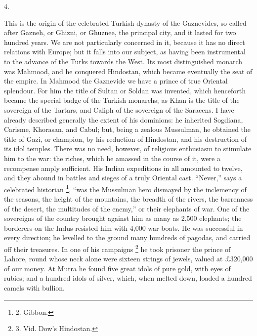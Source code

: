 4.

This is the origin of the
celebrated Turkish dynasty of the Gaznevides, so called after Gazneh,
or Ghizni, or Ghuznee, the principal city, and it lasted for two
hundred years. We are not particularly concerned in it, because it has
no direct relations with Europe; but it falls into our subject, as
having been instrumental to the advance of the Turks towards the West.
Its most distinguished monarch was Mahmood, and he conquered Hindostan,
which became eventually the seat of the empire. In Mahmood the
Gaznevide we have a prince of true Oriental splendour. For him the
title of Sultan or Soldan was invented, which henceforth became the
special badge of the Turkish monarchs; as Khan is the title of the
sovereign of the Tartars, and Caliph of the sovereign of the Saracens.
I have already described generally the extent of his dominions: he
inherited Sogdiana, Carisme, Khorasan, and Cabul; but, being a zealous
Mussulman, he obtained the title of Gazi, or champion, by his
reduction of Hindostan, and his destruction of its idol temples. There was no need, however, of religious enthusiasm to stimulate him
to the war: the riches, which he amassed in the course of it, were a
recompense amply sufficient. His Indian expeditions in all amounted to
twelve, and they abound in battles and sieges of a truly Oriental
cast. ``Never,'' says a celebrated historian \footnote{2.
Gibbon.}, ``was the Mussulman hero dismayed by the inclemency of the
seasons, the height of the mountains, the breadth of the rivers, the
barrenness of the desert, the multitudes of the enemy,'' or their
elephants of war. One of the sovereigns of the country brought against
him as many as 2,500 elephants; the borderers on the Indus resisted
him with 4,000 war-boats. He was successful in every direction; he
levelled to the ground many hundreds of pagodas, and carried off their
treasures. In one of his campaigns \footnote{3.
Vid. Dow's Hindostan.} he took prisoner the prince of Lahore, round whose neck alone
were sixteen strings of jewels, valued at £320,000 of our money. At
Mutra he found five great idols of pure gold, with eyes of rubies; and
a hundred idols of silver, which, when melted down, loaded a hundred
camels with bullion.

